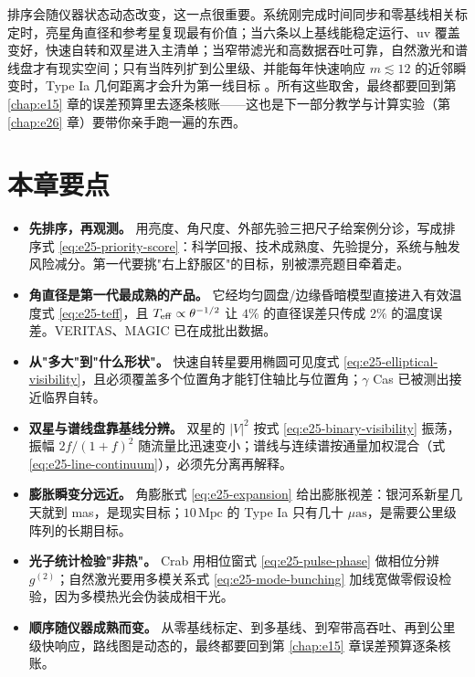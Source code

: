 排序会随仪器状态动态改变，这一点很重要。系统刚完成时间同步和零基线相关标定时，亮星角直径和参考星复现最有价值；当六条以上基线能稳定运行、uv 覆盖变好，快速自转和双星进入主清单；当窄带滤光和高数据吞吐可靠，自然激光和谱线盘才有现实空间；只有当阵列扩到公里级、并能每年快速响应 \(m\lesssim12\) 的近邻瞬变时，Type Ia 几何距离才会升为第一线目标 \citep{2017MNRAS.472.4126G,2022MNRAS.512.1722K,2024MNRAS.529.4387A,2024ApJ...966...28A,2025ApJ...995..191A,2025PhRvD.111h3047K}。所有这些取舍，最终都要回到第 \ref{chap:e15} 章的误差预算里去逐条核账——这也是下一部分教学与计算实验（第 \ref{chap:e26} 章）要带你亲手跑一遍的东西。

\section*{本章要点}

\begin{itemize}
  \item \textbf{先排序，再观测。} 用亮度、角尺度、外部先验三把尺子给案例分诊，写成排序式 \eqref{eq:e25-priority-score}：科学回报、技术成熟度、先验提分，系统与触发风险减分。第一代要挑"右上舒服区"的目标，别被漂亮题目牵着走。
  \item \textbf{角直径是第一代最成熟的产品。} 它经均匀圆盘/边缘昏暗模型直接进入有效温度式 \eqref{eq:e25-teff}，且 \(T_{\rm eff}\propto\theta^{-1/2}\) 让 \(4\%\) 的直径误差只传成 \(2\%\) 的温度误差。VERITAS、MAGIC 已在成批出数据。
  \item \textbf{从"多大"到"什么形状"。} 快速自转星要用椭圆可见度式 \eqref{eq:e25-elliptical-visibility}，且必须覆盖多个位置角才能钉住轴比与位置角；\(\gamma\) Cas 已被测出接近临界自转。
  \item \textbf{双星与谱线盘靠基线分辨。} 双星的 \(|V|^2\) 按式 \eqref{eq:e25-binary-visibility} 振荡，振幅 \(2f/(1+f)^2\) 随流量比迅速变小；谱线与连续谱按通量加权混合（式 \eqref{eq:e25-line-continuum}），必须先分离再解释。
  \item \textbf{膨胀瞬变分远近。} 角膨胀式 \eqref{eq:e25-expansion} 给出膨胀视差：银河系新星几天就到 mas，是现实目标；\(10\,\mathrm{Mpc}\) 的 Type Ia 只有几十 \(\mu\mathrm{as}\)，是需要公里级阵列的长期目标。
  \item \textbf{光子统计检验"非热"。} Crab 用相位窗式 \eqref{eq:e25-pulse-phase} 做相位分辨 \(g^{(2)}\)；自然激光要用多模关系式 \eqref{eq:e25-mode-bunching} 加线宽做零假设检验，因为多模热光会伪装成相干光。
  \item \textbf{顺序随仪器成熟而变。} 从零基线标定、到多基线、到窄带高吞吐、再到公里级快响应，路线图是动态的，最终都要回到第 \ref{chap:e15} 章误差预算逐条核账。
\end{itemize}


